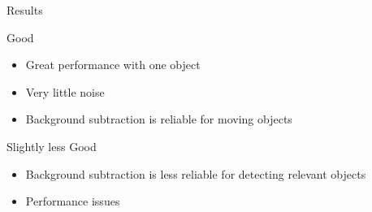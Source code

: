 
\begin{frame}{Results}

Good
	\begin{itemize}
	\item Great performance with one object
	\item Very little noise
	\item Background subtraction is reliable for moving objects
	\end{itemize}
	
	\vspace{4mm}
Slightly less Good
	\begin{itemize}
	\item Background subtraction is less reliable for detecting relevant objects
	\item Performance issues
	\end{itemize}
	
\end{frame}
